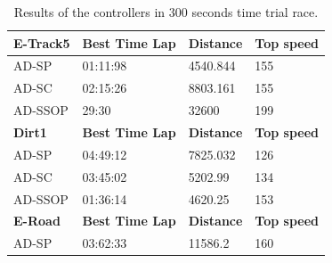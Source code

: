\documentclass[runningheads,a4paper]{llncs}
\begin{document}
	\begin{table} 
		
		\caption{Results of the controllers in 300 seconds time trial race.}
		\label{resulta9}
		{\scriptsize
			\begin{tabular}{ |p{3.5cm}|p{3cm}|p{3cm}|p{2.5cm}|}	
				\hline
				{ \color{blue}\textbf{E-Track5} }&
				{ \color{red}\textbf{Best Time Lap} }&
				{ \color{red} \textbf{Distance} } &
				{ \color{red} \textbf{Top speed} }
				\\
				\hline
				AD-SP &01:11:98  &4540.844&  155
				\\
				\hline
				AD-SC & 02:15:26 &8803.161& 155
				\\
				\hline 
				AD-SSOP & 29:30&32600&199 
				\\
				\hline 
				\hline
				{ \color{blue}\textbf{Dirt1} }&
				{ \color{red}\textbf{Best Time Lap} }&
				{ \color{red} \textbf{Distance} } &
				{ \color{red} \textbf{Top speed} }
				\\
				\hline
				AD-SP & 04:49:12 & 7825.032&126  
				\\
				\hline
				AD-SC & 03:45:02 &5202.99& 134
				\\
				\hline 
				AD-SSOP & 01:36:14 &4620.25& 153 
				\\
				\hline 
				\hline
				{ \color{blue}\textbf{E-Road} }&
				{ \color{red}\textbf{Best Time Lap} }&
				{ \color{red} \textbf{Distance} } &
				{ \color{red} \textbf{Top speed} }
				\\
				\hline
				AD-SP & 03:62:33 & 11586.2 &  160

\end{tabular}}
\end{table}
\end{document}
